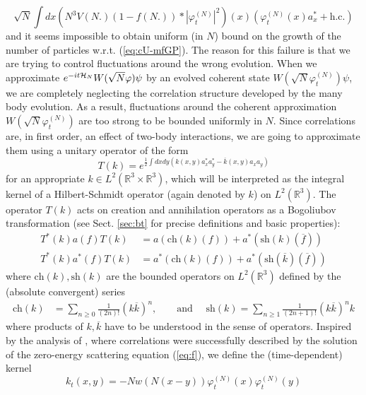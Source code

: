 \documentclass[11pt,a4paper]{article}
\newcommand{\bR}{{\mathbb R}}
\newcommand{\cH}{{\cal H}}
\begin{document}
\begin{equation}\label{eq:lin-N} \sqrt{N} \int dx \left( N^3 V(N.) (1- f(N.)) * |\varphi^{(N)}_t|^2 \right) (x) \left( \varphi^{(N)}_t (x) a_x^* + \text{h.c.} \right)  \end{equation}
and it seems impossible to obtain uniform (in $N$) bound on the growth of the number of particles w.r.t. (\ref{eq:cU-mfGP}). The reason for this failure is that we are trying to control fluctuations around the wrong evolution. When we approximate $e^{-it \cH_N} W(\sqrt{N} \varphi) \psi$ by an evolved coherent state $W(\sqrt{N} \varphi^{(N)}_t) \psi$, we are completely neglecting the correlation structure developed by the many body evolution. As a result, fluctuations around the coherent approximation $W(\sqrt{N} \varphi^{(N)}_t)$ are too strong to be bounded uniformly in $N$. 
Since correlations are, in first order, an effect of two-body interactions, we are going to approximate them using a unitary operator of the form
\[ T(k) = e^{\frac{1}{2} \int dx dy \left(k(x,y) a_x^* a_y^* - \overline{k} (x,y) a_x a_y \right)} \]
for an appropriate $k \in L^2 (\bR^3 \times \bR^3)$, which will be interpreted as the integral kernel of a Hilbert-Schmidt operator (again denoted by $k$) on $L^2 (\bR^3)$. The operator $T(k)$ acts on creation and annihilation operators as a Bogoliubov transformation (see Sect. \ref{sec:bt} for precise definitions and basic properties):
\[ \begin{split} T^* (k) a (f) T (k) &= a(\text{ch} (k) (f)) + a^* (\text{sh} (k) (\overline{f})) \\
T^*(k) a^* (f) T (k) &= a^* (\text{ch} (k) (f)) + a^* (\text{sh} (\overline{k}) (\overline{f}))
\end{split} \]
where $\text{ch} (k), \text{sh} (k)$ are the bounded operators on $L^2 (\bR^3)$ defined by the (absolute convergent) series
\[ \begin{split} 
\text{ch} (k) & = \sum_{n\geq 0} \frac{1}{(2n)!} (k\overline{k})^n  , \qquad \text{and } \quad 
\text{sh} (k)   = \sum_{n \geq 1} \frac{1}{(2n+1)!} (k\overline{k})^n k \end{split} \]
where products of $k,\overline{k}$ have to be understood in the sense of operators. Inspired by the analysis of \cite{ESY1,ESY2,ESY3,ESY4}, where correlations were successfully described by the solution of the zero-energy scattering equation (\ref{eq:f}), we define the (time-dependent) kernel 
\begin{equation}\label{eq:kt-def0} k_t (x,y) = - N w (N(x-y)) \varphi^{(N)}_t (x) \varphi^{(N)}_t (y) \end{equation}
\end{document}
